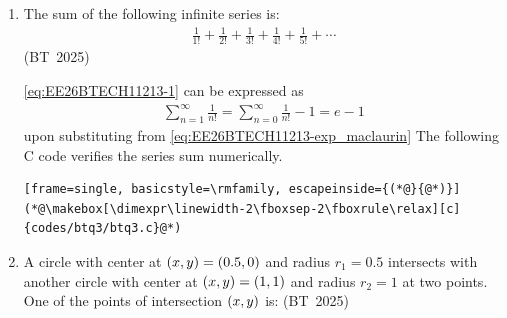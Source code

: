 \begin{enumerate}[label=\thesubsection.\arabic*, ref=\thesubsection.\theenumi,itemsep=0pt]

\item The sum of the following infinite series is:
\begin{align}
\frac{1}{1!} + \frac{1}{2!} + \frac{1}{3!} + \frac{1}{4!} + \frac{1}{5!} + \cdots
\label{eq:EE26BTECH11213-1}
\end{align}
\hfill (BT~2025)
\begin{enumerate}[itemsep=0pt]
\end{enumerate}
\solution
\eqref{eq:EE26BTECH11213-1}
can be expressed as
\begin{align}
\sum_{n=1}^{\infty} \frac{1}{n!} = 
\sum_{n=0}^{\infty} \frac{1}{n!} - 1 = e - 1
\end{align}
upon substituting from \eqref{eq:EE26BTECH11213-exp_maclaurin}
The following C code verifies the series sum numerically.
\begin{lstlisting}[frame=single, basicstyle=\rmfamily, escapeinside={(*@}{@*)}]
(*@\makebox[\dimexpr\linewidth-2\fboxsep-2\fboxrule\relax][c]{codes/btq3/btq3.c}@*)
\end{lstlisting}

\item A circle with center at $\left(x, y\right) = \left(0.5, 0\right)$ and radius $r_1 = 0.5$ intersects with another circle with center at $\left(x, y\right) = \left(1, 1\right)$ and radius $r_2 = 1$ at two points. One of the points of intersection $\left(x, y\right)$ is:
\hfill (BT~2025)
\begin{enumerate}[itemsep=0pt]
\end{enumerate}


\end{enumerate}
